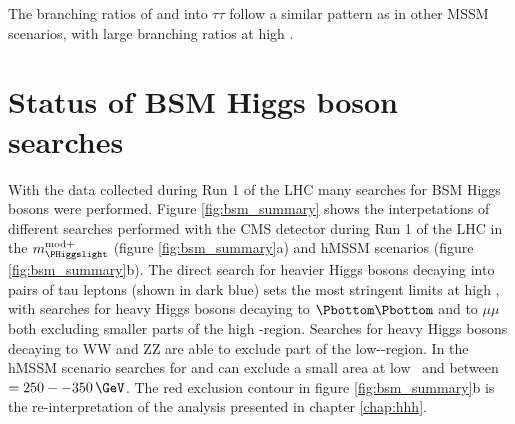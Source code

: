 The branching ratios of \PHiggs and \PHiggsps into $\tau\tau$ follow a similar
pattern as in other MSSM scenarios, with large branching ratios at high \tanb.

\section{Status of BSM Higgs boson searches}
\label{sec:theory_BSMH_status}
With the data collected during 
Run 1 of the \ac{LHC} many searches for BSM Higgs
bosons were performed. Figure \ref{fig:bsm_summary} shows the interpetations
of different searches performed with the \acs{CMS} detector during Run 1 of the \acs{LHC}
in the $m_{\PHiggslight}^{\text{mod+}}$ (figure \ref{fig:bsm_summary}a)
and hMSSM scenarios (figure \ref{fig:bsm_summary}b). The direct search for heavier Higgs bosons decaying into pairs
of tau leptons (shown in dark blue) sets the most stringent limits at high \tanb, with searches for 
heavy Higgs bosons decaying to $\Pbottom\Pbottom$ and to $\mu\mu$ both excluding smaller parts of the high \tanb-region.
Searches for heavy Higgs bosons decaying to WW and ZZ are able to exclude part of the low-\tanb-region. In the 
hMSSM scenario searches for \Htohh and \AtoZh can exclude a small area at low \tanb~and between \mA~$=250--350\,\GeV$.
The red exclusion contour in figure \ref{fig:bsm_summary}b is the re-interpretation of the analysis presented in
chapter \ref{chap:hhh}.

